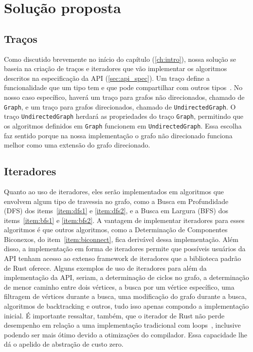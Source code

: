 \section{Solução proposta}

\subsection{Traços}

Como discutido brevemente no início do capítulo (\ref{ch:intro}),
nossa solução se baseia na criação de traços e iteradores que vão
implementar os algoritmos descritos na especificação da API
(\ref{sec:api_spec}). Um traço define a funcionalidade que um tipo
tem e que pode compartilhar com outros tipos~\citep{rustbooktraits}.
No nosso caso específico, haverá um traço para grafos não
direcionados, chamado de \texttt{Graph}, e um traço para grafos
direcionados, chamado de \texttt{UndirectedGraph}. O traço
\texttt{UndirectedGraph} herdará as propriedades do traço
\texttt{Graph}, permitindo que os algoritmos definidos em \texttt{Graph}
funcionem em \texttt{UndirectedGraph}. Essa escolha faz sentido
porque na nossa implementação o grafo não direcionado funciona melhor
como uma extensão do grafo direcionado.

\subsection{Iteradores}

Quanto ao uso de iteradores, eles serão implementados
em algoritmos que envolvem algum tipo de travessia no grafo, como a
Busca em Profundidade (DFS) dos items~\ref{item:dfs1} e \ref{item:dfs2}, e a
Busca em Largura (BFS) dos items~\ref{item:bfs1} e \ref{item:bfs2}. A
vantagem de implementar iteradores para esses algoritmos é que
outros algoritmos, como a Determinação de Componentes Biconexos, do
item~\ref{item:biconnect}, fica derivável dessa implementação. Além
disso, a implementação em forma de iteradores permite
que possíveis usuários da API tenham acesso ao extenso framework de iteradores
que a biblioteca padrão de Rust oferece. Alguns exemplos de uso de
iteradores para além da implementação da API, seriam, a determinação de
ciclos no grafo, a determinação de menor caminho entre dois vértices,
a busca por um vértice específico, uma filtragem de vértices durante a
busca, uma modificação do grafo durante a busca, algoritmos de
backtracking e outros, tudo isso apenas compondo a implementação
inicial. É importante ressaltar, também, que o iterador de Rust não
perde desempenho em relação a uma implementação tradicional com
loops~\citep{rustbookIteratorPerformance,
stackoverflowZerocostAbstractions}, inclusive podendo ser mais
ótimo devido a otimizações do compilador. Essa capacidade lhe dá o apelido de
abstração de custo zero.

